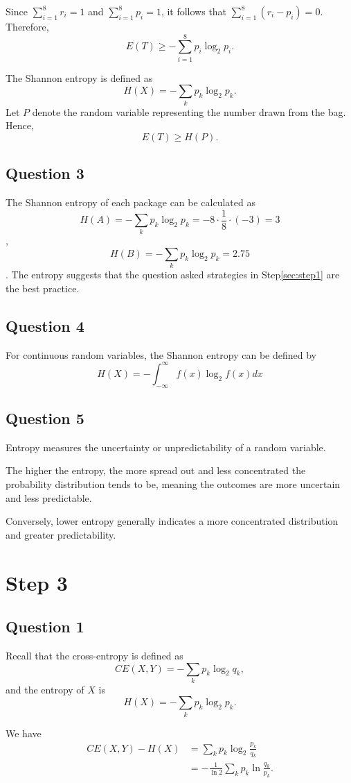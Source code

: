 \documentclass[10pt,a4paper]{article}
\begin{document}
	Since $\sum_{i=1}^{8}r_i=1$ and
	$\sum_{i=1}^{8}p_i=1$, it follows that
	$\sum_{i=1}^{8}(r_i-p_i)=0$. Therefore,
	\[
	E(T)\geq -\sum_{i=1}^{8}p_i\log_2 p_i.
	\]
	
	The Shannon entropy is defined as
	\[
	H(X)=-\sum_k p_k\log_2 p_k.
	\]
	Let $P$ denote the random variable representing the
	number drawn from the bag. Hence,
	\[
	\boxed{E(T)\geq H(P).}
	\]
	\subsection{Question 3}
	The Shannon entropy of each package can be calculated as
	\[
		H(A) = -\sum_k p_k\log_2 p_k = -8\cdot\frac{1}{8}\cdot (-3)=3
	\],
	\[
		H(B) = -\sum_k p_k\log_2 p_k = 2.75
	\]. The entropy suggests that the question asked strategies in Step\ref{sec:step1} are the best practice.
	\subsection{Question 4}
	For continuous random variables, the Shannon entropy can be defined by
	\[
		H(X) = -\int_{-\infty}^{\infty}f(x)\log_2f(x)dx
	\] 
	\subsection{Question 5}
	Entropy measures the uncertainty or unpredictability of a random variable.
	
	The higher the entropy, the more spread out and less concentrated the probability distribution tends to be, meaning the outcomes are more uncertain and less predictable.
	
	Conversely, lower entropy generally indicates a more concentrated distribution and greater predictability.
	\section{Step 3}
	\subsection{Question 1}
	
		Recall that the cross-entropy is defined as
		\[
		CE(X,Y)=-\sum_k p_k\log_2 q_k,
		\]
		and the entropy of \(X\) is
		\[
		H(X)=-\sum_k p_k\log_2 p_k.
		\]
		
		We have
		\begin{align*}
			CE(X,Y)-H(X)
			&=\sum_k p_k\log_2\frac{p_k}{q_k}\\
			&=-\frac{1}{\ln 2}\sum_k p_k\ln\frac{q_k}{p_k}.
		\end{align*}
		
\end{document}
